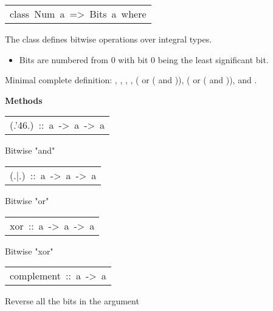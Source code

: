 \begin{haddockdesc}
\item[\begin{tabular}{@{}l}
class\ Num\ a\ =>\ Bits\ a\ where
\end{tabular}]\haddockbegindoc
The  class defines bitwise operations over integral types.
\par
\begin{itemize}
\item
 Bits are numbered from 0 with bit 0 being the least
  significant bit.
\par

\end{itemize}
Minimal complete definition: , , , ,
( or ( and )), ( or ( and )),
 and .
\par

\haddockpremethods{}\textbf{Methods}
\begin{haddockdesc}
\item[\begin{tabular}{@{}l}
(.{\char '46}.)\ ::\ a\ ->\ a\ ->\ a
\end{tabular}]\haddockbegindoc
Bitwise "and"
\par

\end{haddockdesc}
\begin{haddockdesc}
\item[\begin{tabular}{@{}l}
(.|.)\ ::\ a\ ->\ a\ ->\ a
\end{tabular}]\haddockbegindoc
Bitwise "or"
\par

\end{haddockdesc}
\begin{haddockdesc}
\item[\begin{tabular}{@{}l}
xor\ ::\ a\ ->\ a\ ->\ a
\end{tabular}]\haddockbegindoc
Bitwise "xor"
\par

\end{haddockdesc}
\begin{haddockdesc}
\item[\begin{tabular}{@{}l}
complement\ ::\ a\ ->\ a
\end{tabular}]\haddockbegindoc
Reverse all the bits in the argument 
\par


\end{haddockdesc}
\end{haddockdesc}
